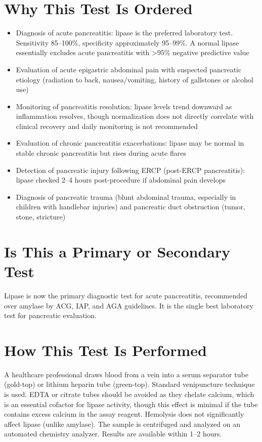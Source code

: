 \section*{Why This Test Is Ordered}
\begin{itemize}
  \item Diagnosis of acute pancreatitis: lipase is the preferred laboratory test. Sensitivity 85--100\%, specificity approximately 95--99\%. A normal lipase essentially excludes acute pancreatitis with >95\% negative predictive value
  \item Evaluation of acute epigastric abdominal pain with suspected pancreatic etiology (radiation to back, nausea/vomiting, history of gallstones or alcohol use)
  \item Monitoring of pancreatitis resolution: lipase levels trend downward as inflammation resolves, though normalization does not directly correlate with clinical recovery and daily monitoring is not recommended
  \item Evaluation of chronic pancreatitis exacerbations: lipase may be normal in stable chronic pancreatitis but rises during acute flares
  \item Detection of pancreatic injury following ERCP (post-ERCP pancreatitis): lipase checked 2--4 hours post-procedure if abdominal pain develops
  \item Diagnosis of pancreatic trauma (blunt abdominal trauma, especially in children with handlebar injuries) and pancreatic duct obstruction (tumor, stone, stricture)
\end{itemize}

\section*{Is This a Primary or Secondary Test}
Lipase is now the primary diagnostic test for acute pancreatitis, recommended over amylase by ACG, IAP, and AGA guidelines. It is the single best laboratory test for pancreatic evaluation.

\section*{How This Test Is Performed}
A healthcare professional draws blood from a vein into a serum separator tube (gold-top) or lithium heparin tube (green-top). Standard venipuncture technique is used. EDTA or citrate tubes should be avoided as they chelate calcium, which is an essential cofactor for lipase activity, though this effect is minimal if the tube contains excess calcium in the assay reagent. Hemolysis does not significantly affect lipase (unlike amylase). The sample is centrifuged and analyzed on an automated chemistry analyzer. Results are available within 1--2 hours.

